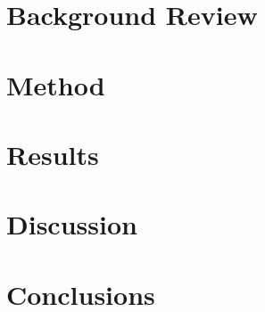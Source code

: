 \documentclass[conference,letterpaper]{IEEEtran}
\begin{document}
\section{Background Review} \label{sec:background}

\FloatBarrier

\section{Method} \label{sec:method}

\FloatBarrier

\section{Results} \label{sec:results}

\FloatBarrier

\section{Discussion} \label{sec:discussion}

\FloatBarrier

\section{Conclusions} \label{sec:conclusions}

\FloatBarrier

%

%
\end{document}
